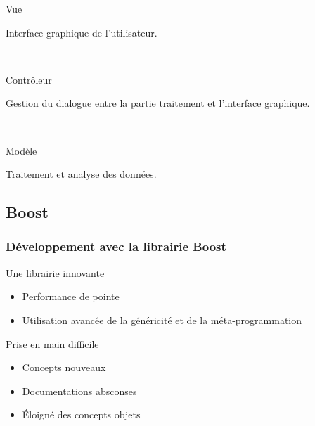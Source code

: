 {\begin{minipage}{0.45\textwidth}
\begin{flushleft}
\begin{center}
\end{center}
\end{flushleft}
\end{minipage}
\begin{minipage}{0.45\textwidth}
\begin{flushright}
\begin{block}{Vue}
\begin{center}
Interface graphique de l'utilisateur.
\end{center}
\end{block}
~\\
\begin{block}{Contrôleur}
\begin{center}
Gestion du dialogue entre la partie traitement et l'interface graphique.
\end{center}
\end{block}
~\\
\begin{block}{Modèle}
\begin{center}
Traitement et analyse des données.
\end{center}
\end{block}
\end{flushright}
\end{minipage}
}

\subsection{Boost}
\frame
{
\frametitle{D\'eveloppement avec la librairie Boost}
\begin{block}{Une librairie innovante}
 \begin{itemize}
  \item Performance de pointe
  \item Utilisation avancée de la généricité et de la méta-programmation
 \end{itemize}
\end{block}
\vfill
\begin{block}{Prise en main difficile}
 \begin{itemize}
  \item Concepts nouveaux
  \item Documentations absconses
  \item \'Eloigné des concepts objets
 \end{itemize}
\end{block}
}